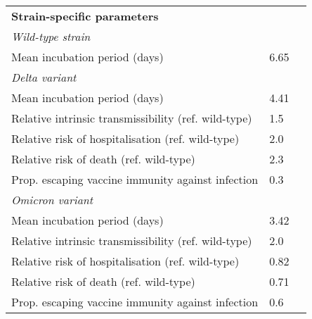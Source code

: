 \begin{table}
{\begin{tabular}{lll}
                   \textbf{Strain-specific parameters} &                              &                                                                 \\
                             \quad \textit{Wild-type strain} &                              &                                                                 \\
                                Mean incubation period (days) &                         6.65 &                                                   \cite{wu2022} \\
                                \quad \textit{Delta variant} &                              &                                                                 \\
                                Mean incubation period (days) &                         4.41 &                                                   \cite{wu2022} \\
         Relative intrinsic transmissibility (ref. wild-type) &                          1.5 &                                          \cite{li2020,meng2021} \\
            Relative risk of hospitalisation (ref. wild-type) &                          2.0 &                                               \cite{fisman2021} \\
                      Relative risk of death (ref. wild-type) &                          2.3 &                                               \cite{fisman2021} \\
            Prop. escaping vaccine immunity against infection &                          0.3 &                                  \cite{jalili2022, lyngse2022a} \\
                              \quad \textit{Omicron variant} &                              &                                                                 \\
                                Mean incubation period (days) &                         3.42 &                                                   \cite{wu2022} \\
         Relative intrinsic transmissibility (ref. wild-type) &                          2.0 &                                   \cite{jalili2022,lyngse2022a} \\
            Relative risk of hospitalisation (ref. wild-type) &                         0.82 &                                    \cite{fisman2021,nyberg2022} \\
                      Relative risk of death (ref. wild-type) &                         0.71 &                                    \cite{fisman2021,nyberg2022} \\
            Prop. escaping vaccine immunity against infection &                          0.6 &                                   \cite{jalili2022,lyngse2022a} \\
\bottomrule
\end{tabular}}
\end{table}
